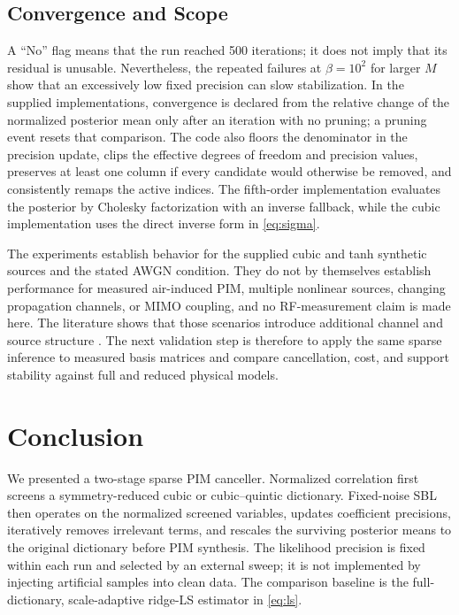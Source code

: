 \documentclass[conference]{IEEEtran}
\begin{document}
\subsection{Convergence and Scope}
A ``No'' flag means that the run reached 500 iterations; it does not imply that its residual is unusable. Nevertheless, the repeated failures at $\beta=10^2$ for larger $M$ show that an excessively low fixed precision can slow stabilization. In the supplied implementations, convergence is declared from the relative change of the normalized posterior mean only after an iteration with no pruning; a pruning event resets that comparison. The code also floors the denominator in the precision update, clips the effective degrees of freedom and precision values, preserves at least one column if every candidate would otherwise be removed, and consistently remaps the active indices. %
The fifth-order implementation evaluates the posterior by Cholesky factorization with an inverse fallback, while the cubic implementation uses the direct inverse form in \eqref{eq:sigma}.

The experiments establish behavior for the supplied cubic and tanh synthetic sources and the stated AWGN condition. They do not by themselves establish performance for measured air-induced PIM, multiple nonlinear sources, changing propagation channels, or MIMO coupling, and no RF-measurement claim is made here. The literature shows that those scenarios introduce additional channel and source structure \cite{Lampu2023Algorithms,Lampu2023Cascade}. The next validation step is therefore to apply the same sparse inference to measured basis matrices and compare cancellation, cost, and support stability against full and reduced physical models.

\section{Conclusion}\label{sec:concl}
We presented a two-stage sparse PIM canceller. Normalized correlation first screens a symmetry-reduced cubic or cubic--quintic dictionary. Fixed-noise SBL then operates on the normalized screened variables, updates coefficient precisions, iteratively removes irrelevant terms, and rescales the surviving posterior means to the original dictionary before PIM synthesis. The likelihood precision is fixed within each run and selected by an external sweep; it is not implemented by injecting artificial samples into clean data. The comparison baseline is the full-dictionary, scale-adaptive ridge-LS estimator in \eqref{eq:ls}.
\end{document}
